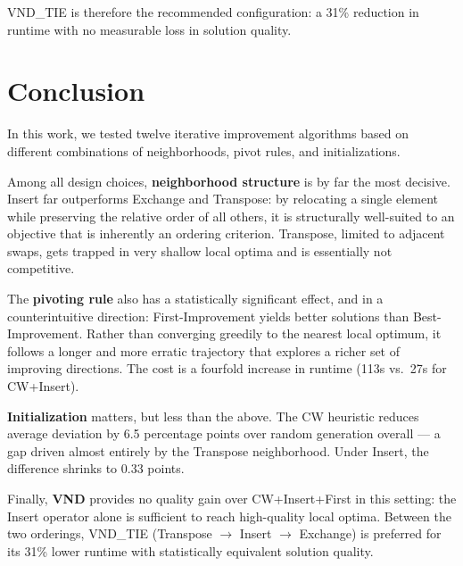 \documentclass[11pt, a4paper]{article}
\begin{document}
VND\_TIE is therefore the recommended configuration: a 31\% reduction in runtime with no measurable loss in solution quality.

\section{Conclusion}
\label{sec:conclusion}

In this work, we tested twelve iterative improvement algorithms based on different combinations of neighborhoods, pivot rules, and initializations.

Among all design choices, \textbf{neighborhood structure} is by far the most decisive. Insert far outperforms Exchange and Transpose: by relocating a single element while preserving the relative order of all others, it is structurally well-suited to an objective that is inherently an ordering criterion. Transpose, limited to adjacent swaps, gets trapped in very shallow local optima and is essentially not competitive.

The \textbf{pivoting rule} also has a statistically significant effect, and in a counterintuitive direction: First-Improvement yields better solutions than Best-Improvement. Rather than converging greedily to the nearest local optimum, it follows a longer and more erratic trajectory that explores a richer set of improving directions. The cost is a fourfold increase in runtime (113s vs.\ 27s for CW+Insert).

\textbf{Initialization} matters, but less than the above. The CW heuristic reduces average deviation by 6.5 percentage points over random generation overall --- a gap driven almost entirely by the Transpose neighborhood. Under Insert, the difference shrinks to 0.33 points.

Finally, \textbf{VND} provides no quality gain over CW+Insert+First in this setting: the Insert operator alone is sufficient to reach high-quality local optima. Between the two orderings, VND\_TIE (Transpose $\to$ Insert $\to$ Exchange) is preferred for its 31\% lower runtime with statistically equivalent solution quality.
\end{document}
